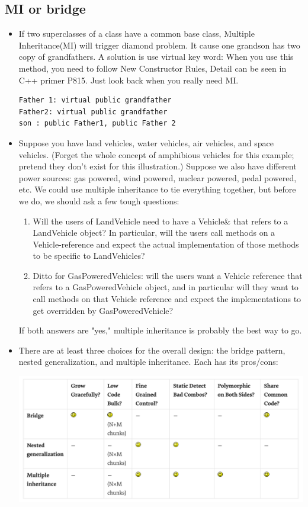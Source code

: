 \documentclass[a4paper,11pt,twoside]{book}
\begin{document}
\subsection{MI or bridge}
\begin{itemize}
    
	\item If two superclasses of a class have a common base class, Multiple Inheritance(MI) will trigger diamond problem. It cause one grandson has two copy of grandfathers. A solution is use virtual key word: When you use this method, you need to follow New Constructor Rules, Detail can be seen in C++ primer P815.  Just look back when you really need MI.

\begin{lstlisting}[numbers=none]
Father 1: virtual public grandfather
Father2: virtual public grandfather
son : public Father1, public Father 2
\end{lstlisting}
	
	\item Suppose you have land vehicles, water vehicles, air vehicles, and space vehicles. (Forget the whole concept of amphibious vehicles for this example; pretend they don't exist for this illustration.) Suppose we also have different power sources: gas powered, wind powered, nuclear powered, pedal powered, etc. We could use multiple inheritance to tie everything together, but before we do, we should ask a few tough questions:
	
	\begin{enumerate}
		\item Will the users of LandVehicle need to have a Vehicle\& that refers to a LandVehicle object? In particular, will the users call methods on a Vehicle-reference and expect the actual implementation of those methods to be specific to LandVehicles?
		
		\item Ditto for GasPoweredVehicles: will the users want a Vehicle reference that refers to a GasPoweredVehicle object, and in particular will they want to call methods on that Vehicle reference and expect the implementations to get overridden by GasPoweredVehicle?
	\end{enumerate}
	If both answers are "yes," multiple inheritance is probably the best way to go.
	
	\item There are at least three choices for the overall design: the bridge pattern, nested generalization, and multiple inheritance. Each has its pros/cons:
\begin{center}
	\includegraphics[scale=0.4]{pics/MI.png}
\end{center}
	

\end{itemize}
\end{document}
